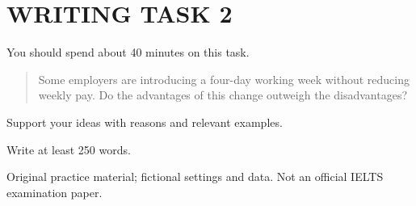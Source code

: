 \section*{WRITING TASK 2}
You should spend about 40 minutes on this task.

\begin{quote}\large Some employers are introducing a four-day working week without reducing weekly pay. Do the advantages of this change outweigh the disadvantages?
\end{quote}
Support your ideas with reasons and relevant examples.

Write at least 250 words.
\par\bigskip
{\footnotesize\color{gray} Original practice material; fictional settings and data. Not an official IELTS examination paper.}
